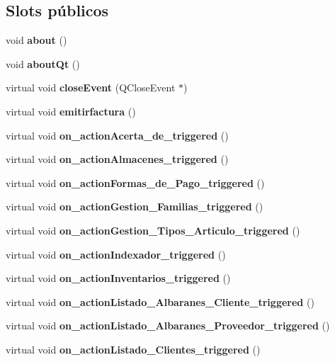 \subsection*{Slots p\'{u}blicos}
\begin{CompactItemize}
\item 
void {\bf about} ()\label{classbulmafact_i0}

\item 
void {\bf about\-Qt} ()\label{classbulmafact_i1}

\item 
virtual void {\bf close\-Event} (QClose\-Event $\ast$)\label{classbulmafact_i2}

\item 
virtual void {\bf emitirfactura} ()\label{classbulmafact_i3}

\item 
virtual void {\bf on\_\-action\-Acerta\_\-de\_\-triggered} ()\label{classbulmafact_i4}

\item 
virtual void {\bf on\_\-action\-Almacenes\_\-triggered} ()\label{classbulmafact_i5}

\item 
virtual void {\bf on\_\-action\-Formas\_\-de\_\-Pago\_\-triggered} ()\label{classbulmafact_i6}

\item 
virtual void {\bf on\_\-action\-Gestion\_\-Familias\_\-triggered} ()\label{classbulmafact_i7}

\item 
virtual void {\bf on\_\-action\-Gestion\_\-Tipos\_\-Articulo\_\-triggered} ()\label{classbulmafact_i8}

\item 
virtual void {\bf on\_\-action\-Indexador\_\-triggered} ()\label{classbulmafact_i9}

\item 
virtual void {\bf on\_\-action\-Inventarios\_\-triggered} ()\label{classbulmafact_i10}

\item 
virtual void {\bf on\_\-action\-Listado\_\-Albaranes\_\-Cliente\_\-triggered} ()\label{classbulmafact_i11}

\item 
virtual void {\bf on\_\-action\-Listado\_\-Albaranes\_\-Proveedor\_\-triggered} ()\label{classbulmafact_i12}

\item 
virtual void {\bf on\_\-action\-Listado\_\-Clientes\_\-triggered} ()\label{classbulmafact_i13}


\end{CompactItemize}
